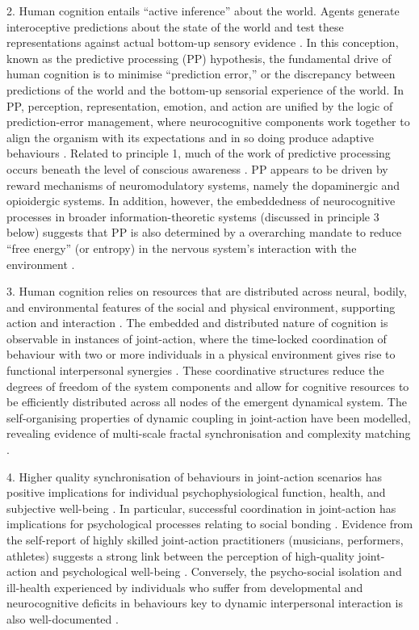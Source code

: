 2. Human cognition entails ``active inference'' \citep{Friston2010} about the world. Agents generate interoceptive predictions about the state of the world and test these representations against actual bottom-up sensory evidence \citep{Clark2013}.  In this conception, known as the predictive processing (PP) hypothesis, the fundamental drive of human cognition is to minimise ``prediction error,'' or the discrepancy between predictions of the world and the bottom-up sensorial experience of the world. In PP, perception, representation, emotion, and action are unified by the logic of prediction-error management, where neurocognitive components work together to align the organism with its expectations and in so doing produce adaptive behaviours \citep{Pezzulo2014}. Related to principle 1, much of the work of predictive processing occurs beneath the level of conscious awareness \citep{Frith2007,Clark2013}.
PP appears to be driven by reward mechanisms of neuromodulatory systems, namely the dopaminergic \citep{Schultz2016} and opioidergic \citep{Laurent2014} systems.  In addition, however, the embeddedness of neurocognitive processes in broader information-theoretic systems (discussed in principle 3 below) suggests that PP is also determined by a overarching mandate to reduce ``free energy'' (or entropy) in the nervous system's interaction with the environment \citep{Friston2010}.

3. Human cognition relies on resources that are distributed across neural, bodily, and environmental features of the social and physical environment, supporting action and interaction \citep{Hutchins1995,Kirsh1995,Smith2004}.  The embedded and distributed nature of cognition is observable in instances of joint-action, where the time-locked coordination of behaviour with two or more individuals in a physical environment gives rise to functional interpersonal synergies \citep{Riley2011,Coey2012}.  These coordinative structures reduce the degrees of freedom of the system components and allow for cognitive resources to be efficiently distributed across all nodes of the emergent dynamical system. The self-organising properties of dynamic coupling in joint-action have been modelled, revealing evidence of multi-scale fractal synchronisation and complexity matching \citep{Schmidt2011,Richardson2012}.

4. Higher quality synchronisation of behaviours in joint-action scenarios has positive implications for individual psychophysiological function, health, and subjective well-being \citep{Wheatley2012}.  In particular, successful coordination in joint-action has implications for psychological processes relating to social bonding \citep{Marsh2009,Launay2016}.  Evidence from the self-report of highly skilled joint-action practitioners (musicians, performers, athletes) suggests a strong link between the perception of high-quality joint-action and psychological well-being \citep{Jackson1995,Jackson1992}.  Conversely, the psycho-social isolation and ill-health experienced by individuals who suffer from developmental and neurocognitive deficits in behaviours key to dynamic interpersonal interaction is also well-documented \citep[e.g.][]{Blakemore2005,Baron-Cohen1991}.

